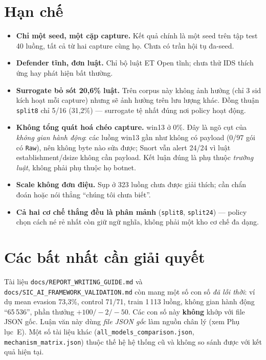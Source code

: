 \documentclass[12pt,a4paper]{report}
\begin{document}
\section{Hạn chế}

\begin{itemize}
  \item \textbf{Chỉ một seed, một cặp capture.} Kết quả chính là một seed trên tập test
        40 luồng, tất cả từ hai capture cùng họ. Chưa có trần hội tụ đa-seed.
  \item \textbf{Defender tĩnh, đơn luật.} Chỉ bộ luật ET Open tĩnh; chưa thử IDS thích
        ứng hay phát hiện bất thường.
  \item \textbf{Surrogate bỏ sót 20{,}6\% luật.} Trên corpus này không ảnh hưởng (chỉ 3
        sid kích hoạt mỗi capture) nhưng sẽ ảnh hưởng trên lưu lượng khác. Đồng thuận
        \texttt{split8} chỉ 5/16 (31{,}2\%) — surrogate tệ nhất đúng nơi policy hoạt động.
  \item \textbf{Không tổng quát hoá chéo capture.} win13 ở 0\%. Đây là ngõ cụt của
        \emph{không gian hành động}: các luồng win13 gần như không có payload (0/97 gói
        có \texttt{Raw}), nên không byte nào sửa được; Snort vẫn alert 24/24 vì luật
        establishment/dsize không cần payload. Kết luận đúng là phụ thuộc \emph{trường
        luật}, không phải phụ thuộc họ botnet.
  \item \textbf{Scale không đơn điệu.} Sụp ở 323 luồng chưa được giải thích; cần chẩn
        đoán hoặc nói thẳng ``chúng tôi chưa biết''.
  \item \textbf{Cả hai cơ chế thắng đều là phân mảnh} (\texttt{split8}, \texttt{split24})
        — policy chọn cách né rẻ nhất còn giữ ngữ nghĩa, không phải một kho cơ chế đa
        dạng.
\end{itemize}

\section{Các bất nhất cần giải quyết}

Tài liệu \texttt{docs/REPORT\_WRITING\_GUIDE.md} và
\texttt{docs/SIC\_AI\_FRAMEWORK\_VALIDATION.md} còn mang một số con số \emph{đã lỗi
thời}: ví dụ mean evasion 73{,}3\%, control 71/71, train 1\,113 luồng, không gian hành
động ``65\,536'', phần thưởng $+100/-2/-50$. Các con số này \textbf{không} khớp với
file JSON gốc. Luận văn này dùng \emph{file JSON gốc} làm nguồn chân lý (xem Phụ lục~E).
Một số tài liệu khác (\texttt{all\_models\_comparison.json},
\texttt{mechanism\_matrix.json}) thuộc thế hệ hệ thống cũ và không so sánh được với kết
quả hiện tại.
\end{document}
